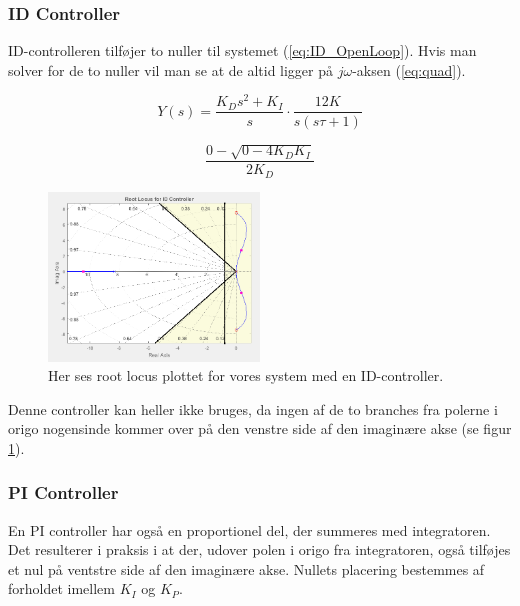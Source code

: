 \subsubsection{ID Controller}

ID-controlleren tilføjer to nuller til systemet (\ref{eq:ID_OpenLoop}). Hvis man solver for de to nuller vil man se at de altid ligger på $j\omega$-aksen (\ref{eq:quad}).

\begin{equation}\label{eq:ID_OpenLoop}
Y(s)=\frac{K_{D}s^2+K_{I}}{s}\cdot\frac{12K}{s(s\tau+1)}
\end{equation}

\begin{equation}\label{eq:quad}
\dfrac{0-\sqrt{0-4K_{D}K_{I}}}{2K_{D}}
\end{equation}

\begin{figure}	
	\begin{center}
		\includegraphics[width=0.5\textwidth]{Billeder/ID_rlocus.PNG}
	\end{center}
\caption{Her ses root locus plottet for vores system med en ID-controller.}
\label{fig:ID_rlocus}
\end{figure}

Denne controller kan heller ikke bruges, da ingen af de to branches fra polerne i origo nogensinde kommer over på den venstre side af den imaginære akse (se figur \ref{fig:ID_rlocus}).

\subsubsection{PI Controller}

En PI controller har også en proportionel del, der summeres med integratoren. Det resulterer i praksis i at der, udover polen i origo fra integratoren, også tilføjes et nul på ventstre side af den imaginære akse. Nullets placering bestemmes af forholdet imellem $K_{I}$ og $K_{P}$.

